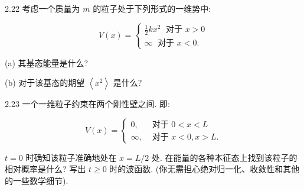 2.22 考虑一个质量为 $m$ 的粒子处于下列形式的一维势中:

$$
V\left( x\right) = \left\{ \begin{array}{l} \frac{1}{2}k{x}^{2}\;\text{ 对于 }x > 0 \\ \infty \;\text{ 对于 }x < 0. \end{array}\right.
$$

(a) 其基态能量是什么?

(b) 对于该基态的期望 $\left\langle {x}^{2}\right\rangle$ 是什么?

2.23 一个一维粒子约束在两个刚性壁之间. 即:

$$
V\left( x\right) = \left\{ \begin{array}{ll} 0, & \text{ 对于 }0 < x < L \\ \infty , & \text{ 对于 }x < 0, x > L. \end{array}\right.
$$

$t = 0$ 时确知该粒子准确地处在 $x = L/2$ 处. 在能量的各种本征态上找到该粒子的相对概率是什么? 写出 $t \geq 0$ 时的波函数. (你无需担心绝对归一化、收敛性和其他的一些数学细节).





	
	
	
	
	
\ifx\allfiles\undefined

	\else
	\fi
